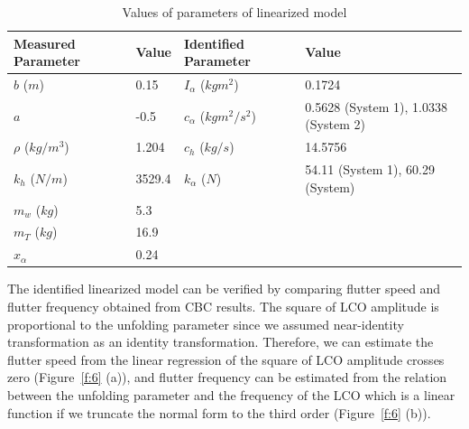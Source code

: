 \documentclass[openacc]{rsproca_new}%
\theoremstyle{own}
\newcommand{\Fref}[1]{Figure~\ref{#1}}
\begin{document}
\begin{table}[!ht]
\caption{Values of parameters of linearized model}%
\label{t2}
\begin{tabular}{llll}%
\hline
Measured Parameter & Value & Identified Parameter & Value\\
\hline
$b$ ($m$) & 0.15   & $I_{\alpha}$ ($kgm^2$) & 0.1724   \\
$a$ & -0.5 & $c_\alpha$ ($kgm^2/s^2$) & 0.5628 (System 1), 1.0338 (System 2)   \\
$\rho$ ($kg/m^3$) & 1.204  & $c_h$ ($kg/s$)  & 14.5756   \\
$k_{h}$ ($N/m$) & 3529.4   & $k_\alpha$ ($N$) & 54.11 (System 1), 60.29 (System)   \\
$m_w$ ($kg$) & 5.3   & & \\
$m_T$ ($kg$) &  16.9   & &  \\
$x_\alpha$ & 0.24 & & \\
\hline
\end{tabular}
\vspace*{-4pt}
\end{table}%

\noindent The identified linearized model can be verified by comparing flutter speed and flutter frequency obtained from CBC results. The square of LCO amplitude is proportional to the unfolding parameter since we assumed near-identity transformation as an identity transformation. Therefore, we can estimate the flutter speed from the linear regression of the square of LCO amplitude crosses zero (\Fref{f:6} (a)), and flutter frequency can be estimated from the relation between the unfolding parameter and the frequency of the LCO which is a linear function if we truncate the normal form to the third order (\Fref{f:6} (b)).
\end{document}
